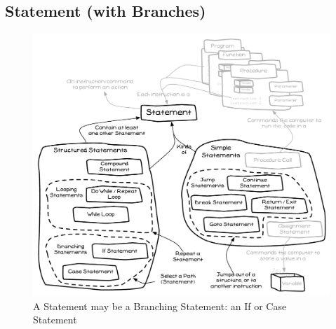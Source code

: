 \clearpage
\subsection{Statement (with Branches)} %
\label{sub:statement_with_branches_}

\begin{figure}[h]
   \centering
   \includegraphics[width=\textwidth]{./topics/control-flow/diagrams/Statement} 
   \caption{A Statement may be a Branching Statement: an If or Case Statement}
   \label{fig:branching-statement}
\end{figure}


